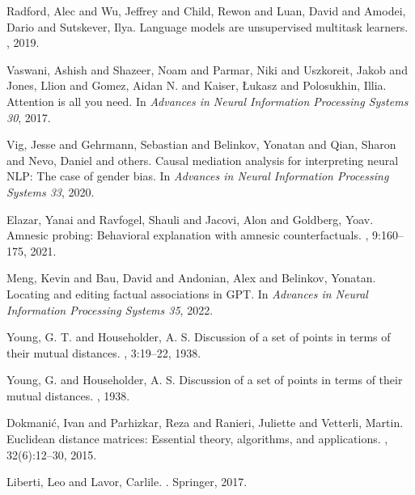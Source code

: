 \documentclass[11pt]{article}
\newcommand{\1}{\mathbf{1}}
\begin{document}
\begin{thebibliography}{99}
Radford, Alec and Wu, Jeffrey and Child, Rewon and Luan, David and Amodei, Dario and Sutskever, Ilya.
\newblock Language models are unsupervised multitask learners.
, 2019.

Vaswani, Ashish and Shazeer, Noam and Parmar, Niki and Uszkoreit, Jakob and Jones, Llion and Gomez, Aidan N. and Kaiser, \L{}ukasz and Polosukhin, Illia.
\newblock Attention is all you need.
\newblock In {\em Advances in Neural Information Processing Systems 30}, 2017.

Vig, Jesse and Gehrmann, Sebastian and Belinkov, Yonatan and Qian, Sharon and Nevo, Daniel and others.
\newblock Causal mediation analysis for interpreting neural NLP: The case of gender bias.
\newblock In {\em Advances in Neural Information Processing Systems 33}, 2020.

Elazar, Yanai and Ravfogel, Shauli and Jacovi, Alon and Goldberg, Yoav.
\newblock Amnesic probing: Behavioral explanation with amnesic counterfactuals.
, 9:160--175, 2021.

Meng, Kevin and Bau, David and Andonian, Alex and Belinkov, Yonatan.
\newblock Locating and editing factual associations in GPT.
\newblock In {\em Advances in Neural Information Processing Systems 35}, 2022.

Young, G. T. and Householder, A. S.
\newblock Discussion of a set of points in terms of their mutual distances.
, 3:19--22, 1938.

Young, G. and Householder, A. S.
\newblock Discussion of a set of points in terms of their mutual distances.
, 1938.

Dokmani\'c, Ivan and Parhizkar, Reza and Ranieri, Juliette and Vetterli, Martin.
\newblock Euclidean distance matrices: Essential theory, algorithms, and applications.
, 32(6):12--30, 2015.

Liberti, Leo and Lavor, Carlile.
.
\newblock Springer, 2017.

\end{thebibliography}
\end{document}
